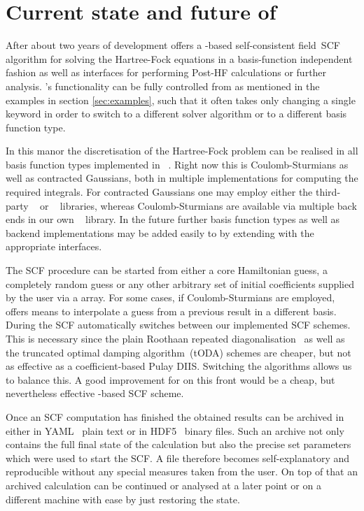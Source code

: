 \section{Current state and future of \molsturm}
\label{sec:state}

After about two years of development
\molsturm offers a \contraction-based
self-consistent field~SCF algorithm for solving the Hartree-Fock equations
in a basis-function independent fashion
as well as interfaces for performing Post-HF calculations or further analysis.
\molsturm's functionality can be fully controlled
from \python as mentioned in the examples in section \ref{sec:examples},
such that it often takes only changing a single keyword
in order to switch to a different solver algorithm or to a different
basis function type.

In this manor the discretisation of the Hartree-Fock problem
can be realised in all basis function types implemented in \gint~\cite{gintWeb}.
Right now this is Coulomb-Sturmians as well as contracted Gaussians,
both in multiple implementations for computing the required integrals.
For contracted Gaussians one may employ either the third-party
\libint~\cite{Libint2,Libint2_231} or \libcint~\cite{Sun2015} libraries,
whereas Coulomb-Sturmians are available via multiple back ends
in our own \sturmint~\cite{sturmintWeb} library.
In the future further basis function types
as well as backend implementations
may be added easily to \molsturm
by extending \gint with the appropriate interfaces.

The SCF procedure can be started from either a core Hamiltonian guess,
a completely random guess or any other arbitrary set of initial
coefficients supplied by the user via a \numpy array.
For some cases, \eg if Coulomb-Sturmians are employed,
\molsturm offers means to interpolate a guess from a previous result
in a different basis.
During the SCF \molsturm automatically switches between
our implemented SCF schemes.
This is necessary since the plain Roothaan
repeated diagonalisation~\cite{Roothaan1951}
as well as the truncated optimal damping algorithm~(tODA) schemes
are cheaper, but not as effective as a coefficient-based Pulay DIIS.
Switching the algorithms allows us to balance this.
A good improvement for \molsturm on this front would be a cheap,
but nevertheless effective \contraction-based SCF scheme.

Once an SCF computation has finished the obtained results can be archived
in either in YAML~\cite{Ben-Kiki2009} plain text or in HDF5~\cite{HDF5Manual}
binary files.
Such an archive not only contains the full final state of the calculation
but also the precise set parameters which were used to start the SCF.
A file therefore becomes self-explanatory and reproducible
without any special measures taken from the user.
On top of that an archived calculation can be continued
or analysed at a later point or on a different machine with ease
by just restoring the state.


